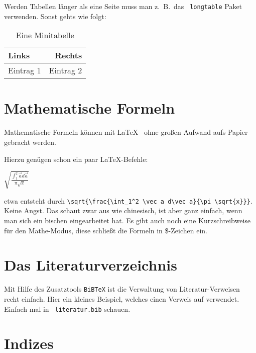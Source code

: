 \documentclass[%
	12pt,		%
	headinclude,	%
	a4paper,	%
	pointlessnumbers, %
	changebar,      %
	liststotoc,	%
	bibtotoc,
	idxtotoc,
	]{diplomarbeit}
\begin{document}
Werden Tabellen länger als eine Seite muss man z.~B.\ das {\tt
longtable} Paket verwenden. Sonst gehts wie folgt:

\begin{table}[!ht]
 \begin{center}
  \begin{tabular}{|l|r|}
        \hline
        Links & Rechts \\
        \hline
        \hline
        Eintrag 1 & Eintrag 2 \\
        \hline
  \end{tabular}
  \caption{\label{tab:minitabelle}Eine Minitabelle}
 \end{center}
\end{table}

\section{Mathematische Formeln}

Mathematische Formeln können mit \LaTeX ~ ohne großen Aufwand
aufs Papier gebracht werden.

Hierzu genügen schon ein paar \LaTeX -Befehle:

\begin{center}
  \begin{math}
    \sqrt{\frac{\int_1^2 \vec a d\vec a}{\pi \sqrt{x}}}
  \end{math}
\end{center}

etwa entsteht durch \verb#\sqrt{\frac{\int_1^2 \vec a d\vec a}{\pi \sqrt{x}}}#.
Keine Angst. Das schaut zwar aus wie chinesisch, ist aber ganz einfach,
wenn man sich ein bischen eingearbeitet hat. Es gibt auch noch eine
Kurzschreibweise für den Mathe-Modus, diese schließt die Formeln in
\$-Zeichen ein.

\section{Das Literaturverzeichnis}

Mit Hilfe des Zusatztools {\tt BiBTeX} ist die Verwaltung von
Literatur-Verweisen recht einfach.  Hier ein kleines Beispiel, welches
einen Verweis auf \cite{kopkaEinf:92} verwendet. Einfach mal in {\tt
literatur.bib} schauen.

\section{Indizes}
\end{document}
